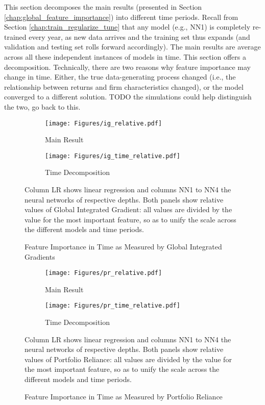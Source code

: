 	This section decomposes the main results (presented in Section \ref{chap:global_feature_importance}) into different time periods. Recall from Section \ref{chap:train_regularize_tune} that any model (e.g., NN1) is completely re-trained every year, as new data arrives and the training set thus expands (and validation and testing set rolls forward accordingly). The main results are average across all these independent instances of models in time. This section offers a decomposition. Technically, there are two reasons why feature importance may change in time. Either, the true data-generating process changed (i.e., the relationship between returns and firm characteristics changed), or the model converged to a different solution. TODO the simulations could help distinguish the two, go back to this. 

	\begin{figure}	
		\centering		
		\begin{subfigure}[t]{\textwidth}
			\texttt{[image: Figures/ig\_relative.pdf]}
			\caption{Main Result}
			\label{fig:ig_time_main}
		\end{subfigure}
		
		\begin{subfigure}[t]{\textwidth}
			\centering
			\texttt{[image: Figures/ig\_time\_relative.pdf]}
			\caption{Time Decomposition}
			\label{fig:ig_time_relative}
		\end{subfigure}
		\caption{Feature Importance in Time as Measured by Global Integrated Gradients}
		\label{fig:ig_time}
		\medskip
		\small
		Column LR shows linear regression and columns NN1 to NN4 the neural networks of respective depths. Both panels show relative values of Global Integrated Gradient: all values are divided by the value for the most important feature, so as to unify the scale across the different models and time periods. 
	\end{figure}

	\begin{figure}	
		\centering		
		\begin{subfigure}[t]{\textwidth}
			\texttt{[image: Figures/pr\_relative.pdf]}
			\caption{Main Result}
			\label{fig:pr_time_main}
		\end{subfigure}
		
		\begin{subfigure}[t]{\textwidth}
			\centering
			\texttt{[image: Figures/pr\_time\_relative.pdf]}
			\caption{Time Decomposition}
			\label{fig:pr_time_relative}
		\end{subfigure}
		\caption{Feature Importance in Time as Measured by Portfolio Reliance}
		\label{fig:pr_time}
		\medskip
		\small
		Column LR shows linear regression and columns NN1 to NN4 the neural networks of respective depths. Both panels show relative values of Portfolio Reliance: all values are divided by the value for the most important feature, so as to unify the scale across the different models and time periods. 
	\end{figure}


